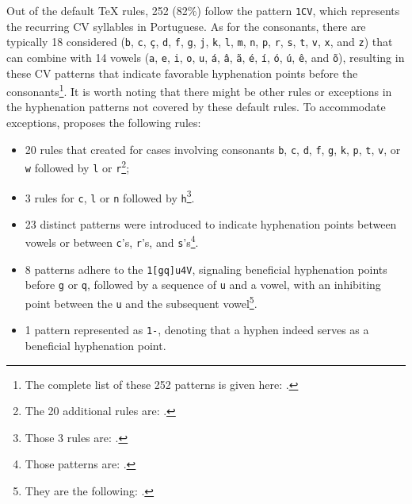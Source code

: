 \documentclass{article}
\begin{document}
%
%
Out of the default \TeX{} rules, 252 (82\%) follow the pattern \verb|1CV|, which
represents the recurring CV syllables in Portuguese.  As for the consonants,
there are typically 18 considered (\verb|b|, \verb|c|, \verb|ç|, \verb|d|,
\verb|f|, \verb|g|, \verb|j|, \verb|k|, \verb|l|, \verb|m|, \verb|n|, \verb|p|,
\verb|r|, \verb|s|, \verb|t|, \verb|v|, \verb|x|, and \verb|z|) that can
combine with 14 vowels (\verb|a|, \verb|e|, \verb|i|, \verb|o|, \verb|u|,
\verb|á|, \verb|â|, \verb|ã|, \verb|é|, \verb|í|, \verb|ó|, \verb|ú|, \verb|ê|,
and \verb|õ|), resulting in these CV patterns that indicate favorable
hyphenation points before the consonants\footnote{The complete list of these
252 patterns is given here: \ExceptionRulesCV{}.}. 
It is worth noting that there might
be other rules or exceptions in the hyphenation patterns not covered by these
default rules.  To accommodate exceptions, \textcite{rezende1987} proposes the 
following rules: 
\begin{itemize}
    \item 20 rules that created for cases involving consonants \verb|b|, \verb|c|, \verb|d|, \verb|f|, \verb|g|, \verb|k|, \verb|p|, \verb|t|, \verb|v|, or \verb|w| followed by \verb|l| or \verb|r|\footnote{The 20 additional rules are: \ExceptionRulesLR{}.};
    \item 3 rules for \verb|c|, \verb|l| or \verb|n| followed by \verb|h|\footnote{Those 3 rules are: \ExceptionRulesCLNH{}.}.
    \item 23 distinct patterns were introduced to indicate hyphenation points between vowels or between \verb|c|'s, \verb|r|'s, and \verb|s|'s\footnote{Those patterns are: \ExceptionRulesThree{}.}. 
    \item 8 patterns adhere to the \verb|1[gq]u4V|, signaling beneficial hyphenation points before \verb|g| or \verb|q|, followed by a sequence of \verb|u| and a vowel, with an inhibiting point between the \verb|u| and the subsequent vowel\footnote{They are the following: \ExceptionRulesFour{}.}.
    \item 1 pattern represented as \verb|1-|, denoting that a hyphen indeed serves as a beneficial hyphenation point.
\end{itemize}
\end{document}
